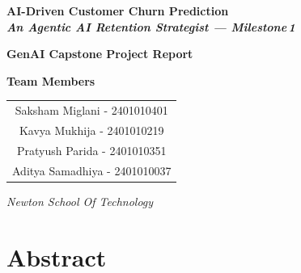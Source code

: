 \documentclass[12pt, a4paper]{article}
\begin{document}
\begin{titlepage}
    \centering
    \vspace*{2cm}

    {\Huge\bfseries AI-Driven Customer Churn Prediction\\[0.3cm]
    \Large\textit{An Agentic AI Retention Strategist --- Milestone\,1}}

    \vspace{1.5cm}

    {\large\textbf{GenAI Capstone Project Report}}

    \vspace{2cm}

    {\Large
    \textbf{Team Members}\\[0.5cm]
    \begin{tabular}{c}
        Saksham Miglani - 2401010401 \\
        Kavya Mukhija - 2401010219\\
        Pratyush Parida - 2401010351 \\
        Aditya Samadhiya - 2401010037
    \end{tabular}
    }

    \vspace{2cm}

    {\large
    \textit{Newton School Of Technology}\\[0.3cm]
    }

    \vfill
\end{titlepage}

\newpage
\tableofcontents
\newpage

\section*{Abstract}
\end{document}
